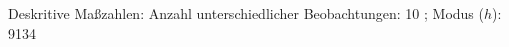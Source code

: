 				\label{tableValues:cstu219d_g3}
				\vspace*{-\baselineskip}
                    \begin{noten}
                	    \note{} Deskritive Maßzahlen:
                	    Anzahl unterschiedlicher Beobachtungen: 10%
                	    ; 
                	      Modus ($h$): 9134
                     \end{noten}


